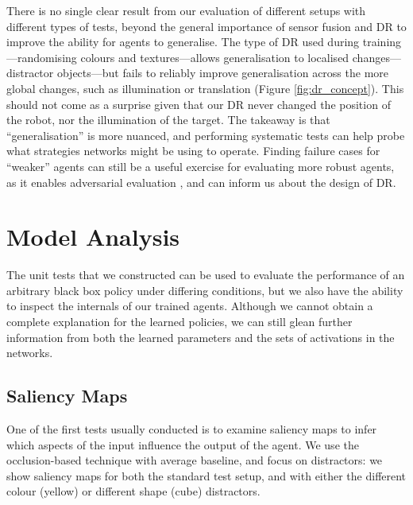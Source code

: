 There is no single clear result from our evaluation of different setups
with different types of tests, beyond the general importance of sensor
fusion and DR to improve the ability for agents to generalise. The type
of DR used during training---randomising colours and textures---allows
generalisation to localised changes---distractor objects---but fails to
reliably improve generalisation across the more global changes, such as
illumination or translation (Figure \ref{fig:dr_concept}). This should
not come as a surprise given that our DR never changed the position of
the robot, nor the illumination of the target. The takeaway is that
``generalisation'' is more nuanced, and performing systematic tests can
help probe what strategies networks might be using to operate. Finding
failure cases for ``weaker'' agents can still be a useful exercise for
evaluating more robust agents, as it enables adversarial evaluation
\cite{uesato2018rigorous}, and can inform us about the design of DR.

\hypertarget{model-analysis}{%
\section{Model Analysis}\label{model-analysis}}

\label{sec:model_analysis}

The unit tests that we constructed can be used to evaluate the
performance of an arbitrary black box policy under differing conditions,
but we also have the ability to inspect the internals of our trained
agents. Although we cannot obtain a complete explanation for the learned
policies, we can still glean further information from both the learned
parameters and the sets of activations in the networks.

\hypertarget{saliency-maps-1}{%
\subsection{Saliency Maps}\label{saliency-maps-1}}

\label{sec:saliency_maps}

One of the first tests usually conducted is to examine saliency maps to
infer which aspects of the input influence the output of the agent. We
use the occlusion-based technique with average baseline, and focus on
distractors: we show saliency maps for both the standard test setup, and
with either the different colour (yellow) or different shape (cube)
distractors.

